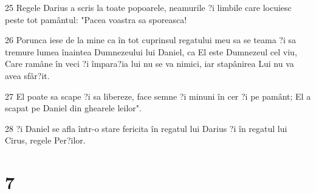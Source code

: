 \par 25 Regele Darius a scris la toate popoarele, neamurile ?i limbile care locuiesc peste tot pamântul: "Pacea voastra sa sporeasca!
\par 26 Porunca iese de la mine ca în tot cuprinsul regatului meu sa se teama ?i sa tremure lumea înaintea Dumnezeului lui Daniel, ca El este Dumnezeul cel viu, Care ramâne în veci ?i împara?ia lui nu se va nimici, iar stapânirea Lui nu va avea sfâr?it.
\par 27 El poate sa scape ?i sa libereze, face semne ?i minuni în cer ?i pe pamânt; El a scapat pe Daniel din ghearele leilor".
\par 28 ?i Daniel se afla într-o stare fericita în regatul lui Darius ?i în regatul lui Cirus, regele Per?ilor.

\chapter{7}

